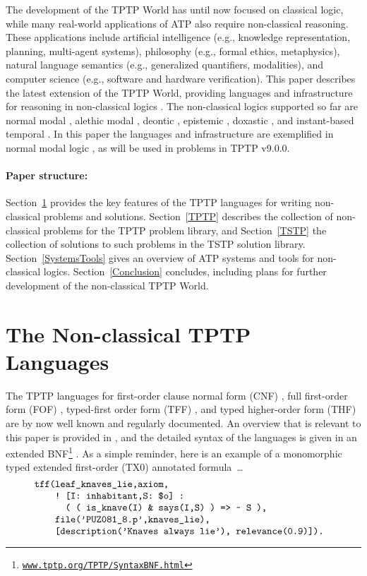 \documentclass[runningheads]{llncs}
\begin{document}
The development of the TPTP World has until now focused on classical logic, while many 
real-world applications of ATP also require non-classical reasoning. 
These applications include artificial intelligence (e.g., knowledge representation, planning, 
multi-agent systems), philosophy (e.g., formal ethics, metaphysics), natural language semantics 
(e.g., generalized quantifiers, modalities), and computer science (e.g., software and hardware 
verification).
This paper describes the latest extension of the TPTP World, providing languages and
infrastructure for reasoning in non-classical logics \cite{Pri08,Gob01}.
The non-classical logics supported so far are
normal modal \cite{FM98},
alethic modal \cite{Sch06-CPL},
deontic \cite{Hil71},
epistemic \cite{vDH15},
doxastic \cite{Hin62}, and
instant-based temporal \cite{GR22}.
In this paper the languages and infrastructure are exemplified in normal modal logic \cite{BBW06},
as will be used in problems in TPTP v9.0.0.

\paragraph{Paper structure:}
Section~\ref{TPTPLanguages} provides the key features of the TPTP languages for writing
non-classical problems and solutions. 
Section~\ref{TPTP} describes the collection of non-classical problems for the TPTP problem library, 
and Section~\ref{TSTP} the collection of solutions to such problems in the TSTP solution library.
Section~\ref{SystemsTools} gives an overview of ATP systems and tools for non-classical logics.
Section~\ref{Conclusion} concludes, including plans for further development of the non-classical
TPTP World.

\section{The Non-classical TPTP Languages}
\label{TPTPLanguages}

The TPTP languages for first-order clause normal form (CNF) \cite{SS98-JAR}, full first-order 
form (FOF) \cite{Sut09}, typed-first order form (TFF) \cite{SS+12,BP13-TFF1}, and typed 
higher-order form (THF) \cite{SB10,KSR16} are by now well known and regularly documented.
An overview that is relevant to this paper is provided in \cite{SF+22}, and the detailed
syntax of the languages is given in an extended BNF\footnote{%
\label{BNF}\href{https://www.tptp.org/TPTP/SyntaxBNF.html}{\tt www.tptp.org/TPTP/SyntaxBNF.html}} 
\cite{VS06}.
As a simple reminder, here is an example of a monomorphic typed extended first-order (TX0) 
annotated formula~\ldots
\[
\begin{minipage}{\textwidth}
\begin{verbatim}
    tff(leaf_knaves_lie,axiom,
        ! [I: inhabitant,S: $o] : 
          ( ( is_knave(I) & says(I,S) ) => ~ S ),
        file('PUZ081_8.p',knaves_lie),
        [description('Knaves always lie'), relevance(0.9)]).
\end{verbatim}
\end{minipage}
\]
\end{document}
